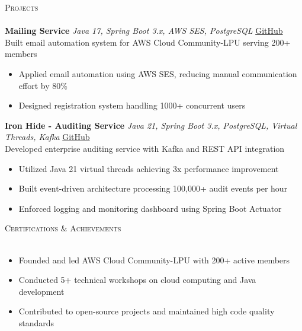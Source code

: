 \documentclass[a4paper]{article}
\newcommand{\lineunder} {
    \vspace*{-8pt} \\
    \hspace*{-18pt} \hrulefill \\
}
\newcommand{\header} [1] {
    {\hspace*{-18pt}\vspace*{6pt} \textsc{#1}}
    \vspace*{-6pt} \lineunder
}
\begin{document}
\header{Projects}
{\textbf{Mailing Service}} {\sl Java 17, Spring Boot 3.x, AWS SES, PostgreSQL} \hfill \href{https://github.com/AWS-Cloud-Community-LPU/mailing-service}{GitHub}\\
Built email automation system for AWS Cloud Community-LPU serving 200+ members
\begin{itemize} \itemsep -2pt
    \item Applied email automation using AWS SES, reducing manual communication effort by 80\%
    \item Designed registration system handling 1000+ concurrent users
\end{itemize}
\vspace*{1mm}

{\textbf{Iron Hide - Auditing Service}} {\sl Java 21, Spring Boot 3.x, PostgreSQL, Virtual Threads, Kafka} \hfill \href{https://github.com/garvit-joshi/ironhide}{GitHub}\\
Developed enterprise auditing service with Kafka and REST API integration
\begin{itemize} \itemsep -2pt
    \item Utilized Java 21 virtual threads achieving 3x performance improvement
    \item Built event-driven architecture processing 100,000+ audit events per hour
    \item Enforced logging and monitoring dashboard using Spring Boot Actuator
\end{itemize}
\vspace*{1mm}

\header{Certifications \& Achievements}
\begin{itemize} \itemsep -2pt
    \item Founded and led AWS Cloud Community-LPU with 200+ active members
    \item Conducted 5+ technical workshops on cloud computing and Java development
    \item Contributed to open-source projects and maintained high code quality standards
\end{itemize}

\ 
\end{document}

